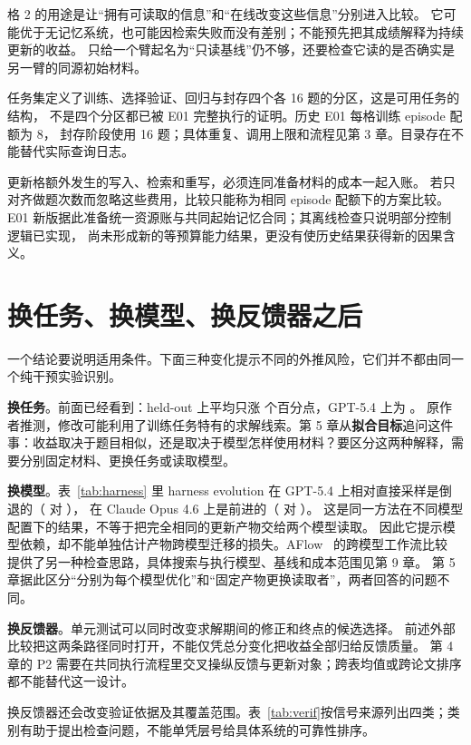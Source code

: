 格 2 的用途是让“拥有可读取的信息”和“在线改变这些信息”分别进入比较。
它可能优于无记忆系统，也可能因检索失败而没有差别；不能预先把其成绩解释为持续更新的收益。
只给一个臂起名为“只读基线”仍不够，还要检查它读的是否确实是另一臂的同源初始材料。

任务集定义了训练、选择验证、回归与封存四个各 16 题的分区，这是可用任务的结构，
不是四个分区都已被 E01 完整执行的证明。历史 E01 每格训练 episode 配额为 8，
封存阶段使用 16 题；具体重复、调用上限和流程见第 3 章。目录存在不能替代实际查询日志。

更新格额外发生的写入、检索和重写，必须连同准备材料的成本一起入账。
若只对齐做题次数而忽略这些费用，比较只能称为相同 episode 配额下的方案比较。
E01 新版据此准备统一资源账与共同起始记忆合同；其离线检查只说明部分控制逻辑已实现，
尚未形成新的等预算能力结果，更没有使历史结果获得新的因果含义。

\section{换任务、换模型、换反馈器之后}
\label{sec:conditions}

一个结论要说明适用条件。下面三种变化提示不同的外推风险，它们并不都由同一个纯干预实验识别。

\textbf{换任务}。前面已经看到：held-out 上平均只涨  个百分点，GPT-5.4 上为 。
原作者推测，修改可能利用了训练任务特有的求解线索。第 5 章从\textbf{拟合目标}追问这件事：收益取决于题目相似，还是取决于模型怎样使用材料？要区分这两种解释，需要分别固定材料、更换任务或读取模型。

\textbf{换模型}。表~\ref{tab:harness} 里 harness evolution 在 GPT-5.4 上相对直接采样是倒退的（ 对 ），
在 Claude Opus 4.6 上是前进的（ 对 ）。
这是同一方法在不同模型配置下的结果，不等于把完全相同的更新产物交给两个模型读取。
因此它提示模型依赖，却不能单独估计产物跨模型迁移的损失。AFlow~\cite{aflow-2410} 的跨模型工作流比较
提供了另一种检查思路，具体搜索与执行模型、基线和成本范围见第 9 章。
第 5 章据此区分“分别为每个模型优化”和“固定产物更换读取者”，两者回答的问题不同。

\textbf{换反馈器}。单元测试可以同时改变求解期间的修正和终点的候选选择。
前述外部比较把这两条路径同时打开，不能仅凭总分变化把收益全部归给反馈质量。
第 4 章的 P2 需要在共同执行流程里交叉操纵反馈与更新对象；跨表均值或跨论文排序都不能替代这一设计。

换反馈器还会改变验证依据及其覆盖范围。表~\ref{tab:verif}按信号来源列出四类；类别有助于提出检查问题，不能单凭层号给具体系统的可靠性排序。

